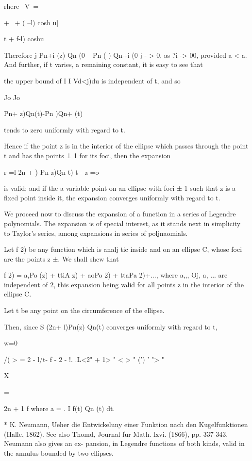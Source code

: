 {{{rhere \ V\ =

+ \ + ( --l) cosh u]

t + f-l) coshu

Therefore j Pn+i (z) Qn (0 ~ Pn ( ) Qn+i (0 j - > 0, as ?i -> 00,
provided a < a. And further, if t varies, a remaining constant, it is
easy to see that

the upper bound of I I Vd<j)du is independent of t, and so

Jo Jo

Pn+ z)Qn(t)-Pn )Qn+ (t)

tends to zero uniformly with regard to t.

Hence if the point z is in the interior of the ellipse which passes
through the point t and has the points ± 1 for its foci, then the
expansion

r =l 2n + ) Pn z)Qn t) t - z =o

is valid; and if the a variable point on an ellipse with foci ± 1 such
that z is a fixed point inside it, the expansion converges uniformly
with regard to t.


We proceed now to discuss the expansion of a function in a series of
Legendre polynomials. The expansion is of special interest, as it
stands next in simplicity to Taylor's series, among expansions in
series of poljnaomials.

Let f 2) be any function which is analj tic inside and on an ellipse
C, whose foci are the points z ±. We shall shew that

f 2) = a,Po (z) + ttiA z) + aoPo 2) + ttaPa 2)+..., where a,,, Oj, a,
... are independent of 2, this expansion being valid for all points z
in the interior of the ellipse C.

Let t be any point on the circumference of the ellipse.

Then, since S (2n+ l)Pn(z) Qn(t) converges uniformly with regard to t,

w=0

/( > = 2 - l/t- f - 2 - !. .L<2" + 1> " < > " (') ' "> "

X

= %

2n + 1 f where a = . I f(t) Qn (t) dt.

* K. Neumann, Ueher die Entwickeluny einer Funktion nach den
Kugelfunktionen (Halle, 1862). See also Thomd, Journal fur Math. lxvi.
(1866), pp. 337-343. Neumann also gives an ex- pansion, in Legendre
functions of both kinds, valid in the annulus bounded by two ellipses.

}}}
